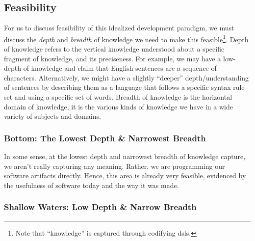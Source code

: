 \subsection{Feasibility}
\label{chap:ideology:sec:thoughts_of_generation:subsec:feasibility}

For us to discuss feasibility of this idealized development paradigm, we must
discuss the \textit{depth} and \textit{breadth} of knowledge we need to make
this feasible\footnote{Note that ``knowledge'' is captured through codifying
\acsp{dsl}.}. Depth of knowledge refers to the vertical knowledge understood
about a specific fragment of knowledge, and its preciseness. For example, we may
have a low-depth of knowledge and claim that English sentences are a sequence of
characters. Alternatively, we might have a slightly ``deeper''
depth/understanding  of sentences by describing them as a language that follows
a specific syntax rule set and using a specific set of words. Breadth of
knowledge is the horizontal domain of knowledge, it is the various kinds of
knowledge we have in a wide variety of subjects and domains.

\subsubsection{Bottom: The Lowest Depth \& Narrowest Breadth}
\label{chap:ideology:sec:thoughts_of_generation:subsec:feasibility:subsubsec:bottom}

In some sense, at the lowest depth and narrowest breadth of knowledge capture,
we aren't really capturing any meaning. Rather, we are programming our software
artifacts directly. Hence, this area is already very feasible, evidenced by the
usefulness of software today and the way it was made.

\subsubsection{Shallow Waters: Low Depth \& Narrow Breadth}
\label{chap:ideology:sec:thoughts_of_generation:subsec:feasibility:subsubsec:low}

